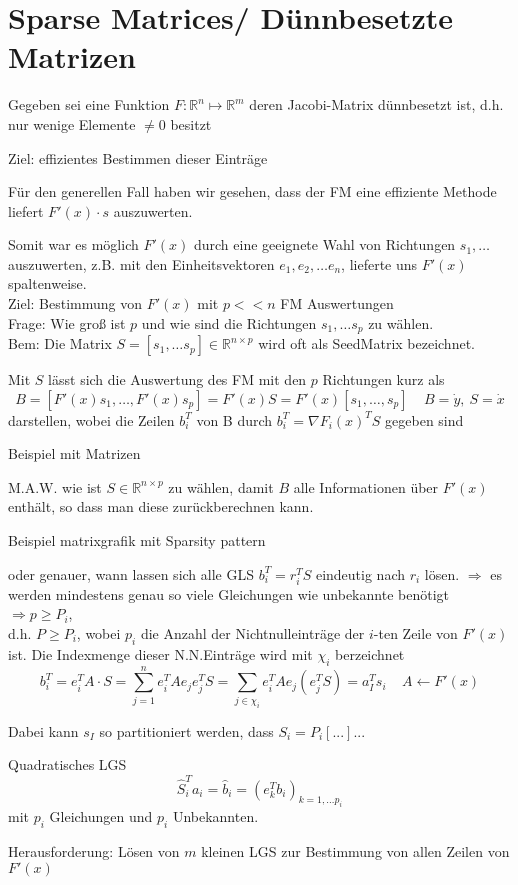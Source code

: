 \section{Sparse Matrices/ Dünnbesetzte Matrizen}
\label{chap:sparsemats}


Gegeben sei eine Funktion $F:\mathbb{R}^n\mapsto\mathbb{R}^m$ deren Jacobi-Matrix dünnbesetzt ist, d.h. nur wenige Elemente $\neq 0 $ besitzt


Ziel: effizientes Bestimmen dieser Einträge

Für den generellen Fall haben wir gesehen, dass der FM eine effiziente Methode liefert $F'(x)\cdot s$ auszuwerten.

Somit war es möglich $F'(x)$ durch eine geeignete Wahl von Richtungen  $s_1,\dots$ auszuwerten, z.B. mit den Einheitsvektoren $e_1,e_2, \dots e_n$, lieferte uns $F'(x)$ spaltenweise.\\



\noindent
Ziel: Bestimmung von $F'(x)$ mit $p <<n$ FM Auswertungen\\
Frage: Wie groß ist $p$ und wie sind die Richtungen $s_1,\dots s_p$ zu wählen.\\
Bem: Die Matrix $S = [s_1, \dots s_p] \in \mathbb{R}^{n\times p}$ wird oft als \glqq Seed\grqq Matrix bezeichnet.

Mit $S$ lässt sich die Auswertung des FM mit den $p$ Richtungen kurz als 
$$B = [ F'(x)s_1 , \dots , F'(x)s_p] = F'(x) S = F'(x) [s_1,\dots,s_p]\ \ \ \ \  B= \dot{y},\ S=\dot{x}$$
darstellen, wobei die Zeilen $b_i^T$ von B durch $b_i^T = \nabla F_i(x)^TS$ gegeben sind

Beispiel mit Matrizen

M.A.W. wie ist $S\in\mathbb{R}^{n\times p}$ zu wählen, damit $B$ alle Informationen über $F'(x)$ enthält, so dass man diese zurückberechnen kann.

Beispiel matrixgrafik mit Sparsity pattern

oder genauer, wann lassen sich alle GLS $b_i^T = r_i^TS$ eindeutig nach $r_i$ lösen.
$\Rightarrow$ es werden mindestens genau so viele Gleichungen wie unbekannte benötigt\\
$\Rightarrow p \ge P_i$,\\

d.h. $P \geq P_i$, wobei $p_i$ die Anzahl der Nichtnulleinträge der $i$-ten Zeile von $F'(x)$ ist. Die Indexmenge dieser N.N.Einträge wird mit $\chi_i$ berzeichnet
$$b_i^T = e_i^T A \cdot S = \sum_{j=1}^n e_i^T A e_j e_j^T S =\sum_{j\in \chi_i} e_i^T A e_j (e_j^T S) = a_I^T s_i \ \ \ \ \ A \leftarrow F'(x)$$

Dabei kann $s_I$ so partitioniert werden, dass $S_i = P_i [...]...$

Quadratisches LGS
$$\hat{S}_i^Ta_i = \hat{b}_i = (e_k^Tb_i)_{k=1,\dots p_i}$$
mit $p_i$ Gleichungen und $p_i$ Unbekannten.

Herausforderung: Lösen von $m$ kleinen LGS zur Bestimmung von allen Zeilen von $F'(x)$\\


